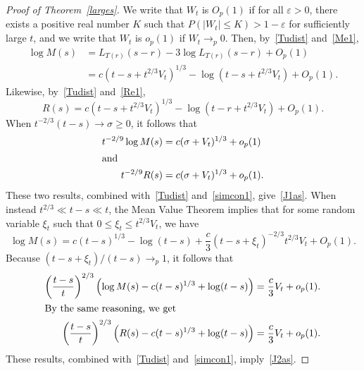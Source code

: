 \documentclass[AHL,Unicode,longabstracts,published]{cedram}
\newcommand*\eps{\varepsilon}
\newcommand{\1} {\mathds{1}}
\renewcommand*\to{\rightarrow}
\begin{document}
\begin{proof}[Proof of Theorem~\ref{larges}]
We write that $W_t$ is $O_p(1)$ if for all $\eps > 0$, there exists a positive real number $K$ such that $P(|W_t| \leq K) > 1 - \eps$ for sufficiently large $t$, and we write that $W_t$ is $o_p(1)$ if $W_t \rightarrow_p 0$. Then, by~\eqref{Tudist} and~\eqref{Me1},
\begin{align*}
\log M(s) &= L_{T(r)}(s - r) - 3 \log L_{T(r)}(s - r) + O_p(1) \\
&= c\left(t - s + t^{2/3} V_t\right)^{1/3} - \log \left(t - s + t^{2/3} V_t\right) + O_p(1).
\end{align*}
Likewise, by~\eqref{Tudist} and~\eqref{Re1},
\[
R(s) = c \left(t - s + t^{2/3} V_t\right)^{1/3} - \log \left(t - r + t^{2/3} V_t\right) + O_p(1).
\]
When $t^{-2/3}(t - s) \to \sigma \geq 0$, it follows that
\begin{align*}
t^{-2/9} \log M(s) &= c(\sigma + V_t)^{1/3} + o_p(1)
\\
\intertext{and}
t^{-2/9} R(s) &= c(\sigma + V_t)^{1/3} + o_p(1).
\end{align*}
These two results, combined with~\eqref{Tudist} and~\eqref{simcon1}, give~\eqref{J1as}.
When instead $t^{2/3} \ll t - s \ll t$, the Mean Value Theorem implies that for some random variable $\xi_t$ such that $0 \leq \xi_t \leq t^{2/3} V_t$, we have
\[
\log M(s) = c (t - s)^{1/3} - \log(t - s) + \frac{c}{3} \left(t - s + \xi_t\right)^{-2/3} t^{2/3} V_t + O_p(1).
\]
Because $(t - s + \xi_t)/(t - s) \rightarrow_p 1$, it follows that
\begin{align*}
\left(\frac{t - s}{t} \right)^{2/3} \left(\log M(s) - c(t - s)^{1/3} + \log(t - s) \right) &= \frac{c}{3} V_t + o_p(1).
\\
\intertext{By the same reasoning, we get}
\left(\frac{t - s}{t} \right)^{2/3} \left(R(s) - c(t - s)^{1/3} + \log(t - s) \right) &= \frac{c}{3} V_t + o_p(1).
\end{align*}
These results, combined with~\eqref{Tudist} and~\eqref{simcon1}, imply~\eqref{J2as}.
\end{proof}
\end{document}
